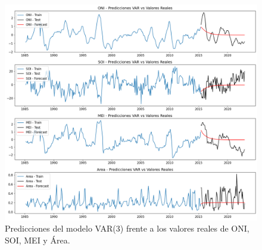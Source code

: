 \begin{figure}[H]
    \centering
    \includegraphics[scale=0.32]{Figures/var_pred.png}
    \caption{Predicciones del modelo VAR(3) frente a los valores reales de ONI, SOI, MEI y Área.}
    \label{fig:var_pred}
\end{figure}